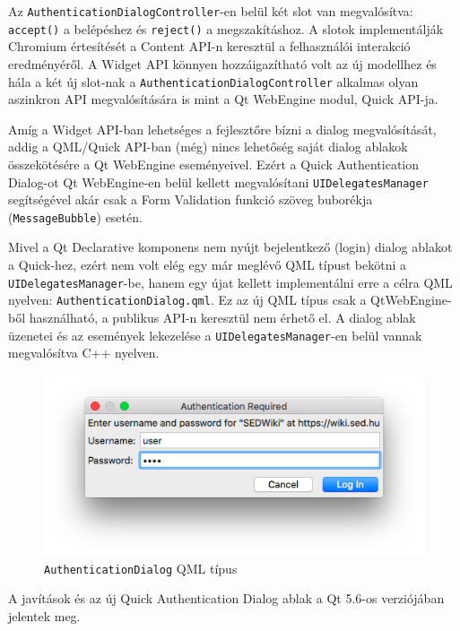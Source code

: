\documentclass[12pt]{report}
\begin{document}
Az \texttt{AuthenticationDialogController}-en
belül két slot van megvalósítva: \texttt{accept()} a belépéshez és \texttt{reject()} a
megszakításhoz. A slotok implementálják Chromium értesítését a Content API-n keresztül a
felhasználói interakció eredményéről. A Widget API könnyen hozzáigazítható volt az új
modellhez és hála a két új slot-nak a \texttt{AuthenticationDialogController} alkalmas
olyan aszinkron API megvalósítására is mint a Qt WebEngine modul, Quick API-ja.

Amíg a Widget API-ban lehetséges a fejlesztőre bízni a dialog megvalósítását, addig a
QML/Quick API-ban (még) nincs lehetőség saját dialog ablakok összekötésére a Qt WebEngine
eseményeivel. Ezért a Quick Authentication Dialog-ot Qt WebEngine-en belül kellett
megvalósítani \texttt{UIDelegatesManager} segítségével akár csak a Form Validation funkció
szöveg buborékja (\texttt{MessageBubble}) esetén.

Mivel a Qt Declarative komponens nem nyújt bejelentkező (login) dialog ablakot a Quick-hez,
ezért nem volt elég egy már meglévő QML típust bekötni a \\
\texttt{UIDelegatesManager}-be, hanem egy újat kellett implementálni erre a célra
QML nyelven: \texttt{AuthenticationDialog.qml}. Ez az új QML típus csak a QtWebEngine-ből
használható, a publikus API-n keresztül nem érhető el. A dialog ablak üzenetei és az
események lekezelése a \texttt{UIDelegatesManager}-en belül vannak megvalósítva C++
nyelven.

\begin{figure}[ht]
    \centering
    \includegraphics[scale=0.75]{ad-quick-screenshot}
    \caption{
        \label{fig:ad-quick-screenshot}
        \texttt{AuthenticationDialog} QML típus
    }
\end{figure}

A javítások és az új Quick Authentication Dialog ablak a Qt 5.6-os verziójában jelentek meg.
\end{document}

